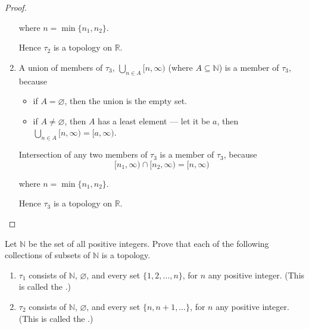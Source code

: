 \begin{proof}
\begin{enumerate}[label={(\roman*)}]
		      where $n = \min\{ n_{1}, n_{2} \}$.

		      Hence $\tau_{2}$ is a topology on $\mathbb{R}$.
		\item A union of members of $\tau_{3}$, $\bigcup_{n\in A} [n, \infty)$ (where $A\subseteq \mathbb{N}$) is a member of $\tau_{3}$, because
		      \begin{itemize}
			      \item if $A = \varnothing$, then the union is the empty set.
			      \item if $A\ne\varnothing$, then $A$ has a least element --- let it be $a$, then $\bigcup_{n\in A} [n, \infty) = [a, \infty)$.
		      \end{itemize}

		      Intersection of any two members of $\tau_{3}$ is a member of $\tau_{3}$, because
		      \[
			      [n_{1}, \infty) \cap [n_{2}, \infty) = [n, \infty)
		      \]

		      where $n = \min\{ n_{1}, n_{2} \}$.

		      Hence $\tau_{3}$ is a topology on $\mathbb{R}$.
	\end{enumerate}
\end{proof}
\newpage

\begin{exercise}
	Let $\mathbb{N}$ be the set of all positive integers. Prove that each of the following collections of subsets of $\mathbb{N}$ is a topology.
	\begin{enumerate}[label={(\roman*)}]
		\item $\tau_{1}$ consists of $\mathbb{N}$, $\varnothing$, and every set $\{ 1, 2, \ldots, n \}$, for $n$ any positive integer. (This is called the {\color{red}{initial segment topology}}.)
		\item $\tau_{2}$ consists of $\mathbb{N}$, $\varnothing$, and every set $\{ n, n+1, \ldots \}$, for $n$ any positive integer. (This is called the {\color{red}{final segment topology}}.)
	\end{enumerate}
\end{exercise}

